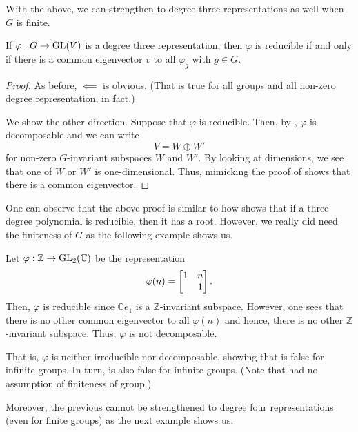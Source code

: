 With the above, we can strengthen  to degree three representations as well when $G$ is finite.
\begin{prop} \label{prop:deg3repirreducible}
	If $\varphi:G\to \operatorname{GL}(V)$ is a degree three representation, then $\varphi$ is reducible if and only if there is a common eigenvector $v$ to all $\varphi_g$ with $g \in G.$
\end{prop}
\begin{proof} 
	As before, $\impliedby$ is obvious. (That is true for all groups and all non-zero degree representation, in fact.)

	We show the other direction. Suppose that $\varphi$ is reducible. Then, by , $\varphi$ is decomposable and we can write
	\begin{equation*} 
		V = W \oplus W'
	\end{equation*}
	for non-zero $G$-invariant subspaces $W$ and $W'.$ By looking at dimensions, we see that one of $W$ or $W'$ is one-dimensional. Thus, mimicking the proof of  shows that there is a common eigenvector.
\end{proof}
One can observe that the above proof is similar to how shows that if a three degree polynomial is reducible, then it has a root. However, we really did need the finiteness of $G$ as the following example shows us.

\begin{ex} \label{ex:Zredbutnotdecomposable}
	Let $\varphi:\mathbb{Z} \to \operatorname{GL}_2(\mathbb{C})$ be the representation
	\begin{equation*} 
		\varphi(n) = \begin{bmatrix} 1 & n \\  & 1 \end{bmatrix}.
	\end{equation*}
	Then, $\varphi$ is reducible since $\mathbb{C}e_1$ is a $\mathbb{Z}$-invariant subspace. However, one sees that there is no other common eigenvector to all $\varphi(n)$ and hence, there is no other $\mathbb{Z}$-invariant subspace. Thus, $\varphi$ is not decomposable.

	That is, $\varphi$ is neither irreducible nor decomposable, showing that  is false for infinite groups. In turn,  is also false for infinite groups. (Note that  had no  assumption of finiteness of group.)
\end{ex}

Moreover, the previous cannot be strengthened to degree four representations (even for finite groups) as the next example shows us.

